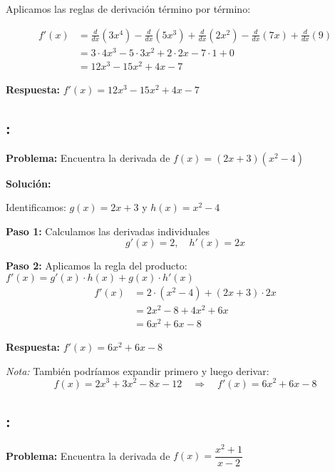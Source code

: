 \documentclass[12pt,a4paper]{article}
\begin{document}
Aplicamos las reglas de derivación término por término:

\begin{align*}
f'(x) &= \frac{d}{dx}(3x^4) - \frac{d}{dx}(5x^3) + \frac{d}{dx}(2x^2) - \frac{d}{dx}(7x) + \frac{d}{dx}(9) \\
&= 3 \cdot 4x^3 - 5 \cdot 3x^2 + 2 \cdot 2x - 7 \cdot 1 + 0 \\
&= 12x^3 - 15x^2 + 4x - 7
\end{align*}

\textbf{Respuesta:} $\boxed{f'(x) = 12x^3 - 15x^2 + 4x - 7}$

\subsection*{{\color{blue!40!red}{Ejemplo 3}}: \color{blue!80!black}{Derivada usando la regla del producto}}

\textbf{Problema:} Encuentra la derivada de $f(x) = (2x + 3)(x^2 - 4)$

\bigskip

\textbf{Solución:}

Identificamos: $g(x) = 2x + 3$ y $h(x) = x^2 - 4$

\textbf{Paso 1:} Calculamos las derivadas individuales
\[
g'(x) = 2, \quad h'(x) = 2x
\]

\textbf{Paso 2:} Aplicamos la regla del producto: $f'(x) = g'(x) \cdot h(x) + g(x) \cdot h'(x)$
\begin{align*}
f'(x) &= 2 \cdot (x^2 - 4) + (2x + 3) \cdot 2x \\
&= 2x^2 - 8 + 4x^2 + 6x \\
&= 6x^2 + 6x - 8
\end{align*}

\textbf{Respuesta:} $\boxed{f'(x) = 6x^2 + 6x - 8}$

\bigskip

\textit{Nota:} También podríamos expandir primero y luego derivar:
\[
f(x) = 2x^3 + 3x^2 - 8x - 12 \quad \Rightarrow \quad f'(x) = 6x^2 + 6x - 8
\]

\subsection*{{\color{blue!40!red}{Ejemplo 4}}: \color{blue!80!black}{Derivada usando la regla del cociente}}

\textbf{Problema:} Encuentra la derivada de $f(x) = \dfrac{x^2 + 1}{x - 2}$

\bigskip
\end{document}

